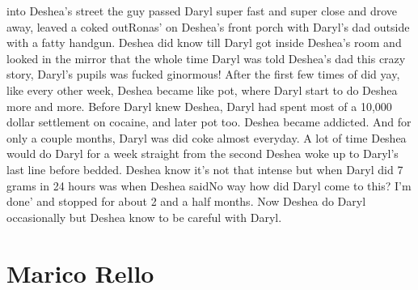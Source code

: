 \documentclass[12pt]{book}
\begin{document}
into Deshea's street the guy passed Daryl super fast and super close and drove away, leaved a coked outRonas' on Deshea's front porch with Daryl's dad outside with a fatty handgun. Deshea did know till Daryl got inside Deshea's room and looked in the mirror that the whole time Daryl was told Deshea's dad this crazy story, Daryl's pupils was fucked ginormous! After the first few times of did yay, like every other week, Deshea became like pot, where Daryl start to do Deshea more and more. Before Daryl knew Deshea, Daryl had spent most of a 10,000 dollar settlement on cocaine, and later pot too. Deshea became addicted. And for only a couple months, Daryl was did coke almost everyday. A lot of time Deshea would do Daryl for a week straight from the second Deshea woke up to Daryl's last line before bedded. Deshea know it's not that intense but when Daryl did 7 grams in 24 hours was when Deshea saidNo way how did Daryl come to this? I'm done' and stopped for about 2 and a half months. Now Deshea do Daryl occasionally but Deshea know to be careful with Daryl.



\chapter{Marico Rello}
\end{document}
